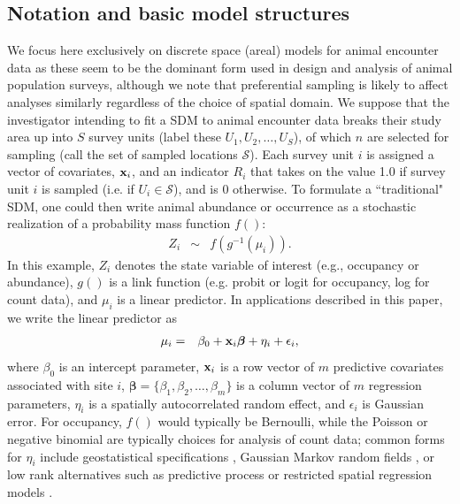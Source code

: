 \documentclass[times,mee,doublespace,]{besauth2}
\begin{document}
\subsection{Notation and basic model structures}

We focus here exclusively on discrete space (areal) models for animal encounter data as these seem to be the dominant form used in design and analysis of animal population surveys, although we note that preferential sampling is likely to affect analyses similarly regardless of the choice of spatial domain.  We suppose that the investigator intending to fit a SDM to animal encounter data breaks their study area up into $S$ survey units (label these $U_1, U_2, \hdots, U_S$), of which $n$ are selected for sampling (call the set of sampled locations $\mathcal{S}$). Each survey unit $i$ is assigned a vector of covariates, ${\bf x}_i$, and an indicator $R_i$ that takes on the value 1.0 if survey unit $i$ is sampled (i.e. if $U_i \in \mathcal{S}$), and is 0 otherwise.  To formulate a ``traditional" SDM, one could then write animal abundance or occurrence as a stochastic realization of a probability mass function $f()$:
\begin{eqnarray}
  \label{eq:process}
  Z_i & \sim & f(g^{-1}(\mu_i)).
\end{eqnarray}
In this example, $Z_i$ denotes the state variable of interest (e.g., occupancy or abundance), $g()$ is a link function (e.g. probit or logit for occupancy, log for count data), and $\mu_i$ is a linear predictor.  In applications described in this paper, we write the linear predictor as
\begin{eqnarray}
\mu_i & = & \beta_0 + {\bf x}_i \boldsymbol{\beta}+\eta_i+\epsilon_i,
 \label{eq:mu}
\end{eqnarray}
where $\beta_0$ is an intercept parameter, ${\bf x}_i$ is a row vector of $m$ predictive covariates associated with site $i$, $\boldsymbol{\beta} = \{ \beta_1, \beta_2, \hdots, \beta_m \}$ is a column vector of $m$ regression parameters, $\eta_i$ is a spatially autocorrelated random effect, and $\epsilon_i$ is Gaussian error.  For occupancy, $f()$ would typically be Bernoulli, while the Poisson or negative binomial are typically choices for analysis of count data; common forms for $\eta_i$ include geostatistical specifications \citep{Cressie1993,DiggleEtAl1998}, Gaussian Markov random fields \citep[e.g. conditionally autoregressive models;][]{RueHeld2005}, or low rank alternatives such as predictive process \citep{BanerjeeEtAl2008,LatimerEtAl2009} or restricted spatial regression models \citep{Reich2006,Hughes2013}.
\end{document}

